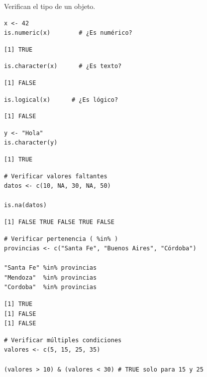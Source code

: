 \documentclass[8pt]{beamer}
\begin{document}
\begin{frame}[fragile]
	Verifican el tipo de un objeto.
\begin{lstlisting}[style=RScript]
x <- 42
is.numeric(x)        # ¿Es numérico?
\end{lstlisting}
\begin{lstlisting}[style=RConsole]
[1] TRUE
\end{lstlisting}
\begin{lstlisting}[style=RScript]
is.character(x)      # ¿Es texto?	
\end{lstlisting}
\begin{lstlisting}[style=RConsole]
[1] FALSE
\end{lstlisting}
\begin{lstlisting}[style=RScript]
is.logical(x)      # ¿Es lógico?	
\end{lstlisting}
\begin{lstlisting}[style=RConsole]
[1] FALSE
\end{lstlisting}
\begin{lstlisting}[style=RScript]
y <- "Hola"
is.character(y)
\end{lstlisting}
\begin{lstlisting}[style=RConsole]
[1] TRUE
\end{lstlisting}
\end{frame}








\begin{frame}[fragile]
\begin{lstlisting}[style=RScript]
# Verificar valores faltantes
datos <- c(10, NA, 30, NA, 50)

is.na(datos)
\end{lstlisting}

\begin{lstlisting}[style=RConsole]
[1] FALSE TRUE FALSE TRUE FALSE
\end{lstlisting}

\begin{lstlisting}[style=RScript]
# Verificar pertenencia ( %in% )
provincias <- c("Santa Fe", "Buenos Aires", "Córdoba")

"Santa Fe" %in% provincias
"Mendoza"  %in% provincias
"Cordoba"  %in% provincias
\end{lstlisting}
\begin{lstlisting}[style=RConsole]
[1] TRUE
[1] FALSE
[1] FALSE
\end{lstlisting}

\begin{lstlisting}[style=RScript]
# Verificar múltiples condiciones
valores <- c(5, 15, 25, 35)

(valores > 10) & (valores < 30) # TRUE solo para 15 y 25
\end{lstlisting}
\end{frame}
\end{document}
